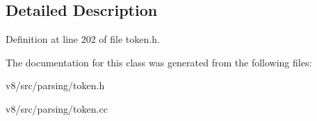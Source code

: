 \subsection{Detailed Description}


Definition at line 202 of file token.\+h.



The documentation for this class was generated from the following files\+:\begin{DoxyCompactItemize}
\item 
v8/src/parsing/token.\+h\item 
v8/src/parsing/token.\+cc\end{DoxyCompactItemize}
